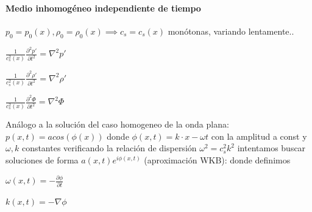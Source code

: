 \documentclass{article}
\begin{document}
\paragraph{Medio inhomogéneo independiente de tiempo} $p_0 = p_0(x),\rho_0 = \rho_0(x)\implies c_s = c_s(x)$ monótonas, variando lentamente..
\begin{description}  
\item $\frac{1}{c_s^{2}(x)} \frac{\partial^{2} p\prime}{\partial t^{2}} = \nabla^{2} p\prime    $
\item $\frac{1}{c_s^{2}(x)} \frac{\partial^{2} \rho\prime}{\partial t^{2}} = \nabla^{2} \rho\prime    $
\item $\frac{1}{c_s^{2}(x)} \frac{\partial^{2} \Phi}{\partial t^{2}} = \nabla^{2} \Phi    $
\item Análogo a la solución del caso homogeneo de la onda plana:
 $p(x,t)=a cos(\phi(x))$ donde $\phi(x,t) = k\cdot x-\omega t$ con la amplitud a const y $\omega, k$ constantes verificando la relación de dispersión $\omega^{2} = c_s^2 k^2  $ intentamos  buscar soluciones de forma $a(x,t) e^{i\phi(x,t)}$ (aproximación WKB): 
 donde definimos 
\item $\omega(x,t) = -\frac{\partial \phi}{\partial t}$
\item $k(x,t) = -\nabla \phi$
\end{description}
\end{document}
